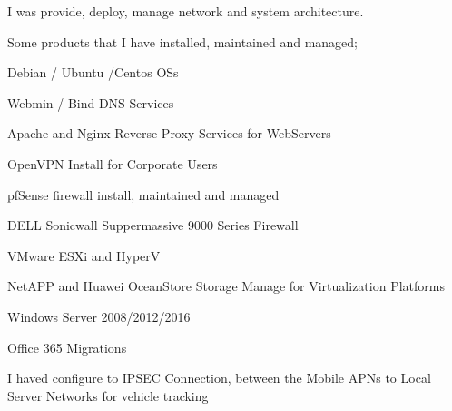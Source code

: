 \begin{cventries}
{\begin{cvitems}
        \item {I was provide, deploy, manage network and system architecture.}
        \item {Some products that I have installed, maintained and managed;}
        \item {Debian / Ubuntu /Centos OSs}
        \item {Webmin / Bind DNS Services}
        \item {Apache and Nginx Reverse Proxy Services for WebServers}
        \item {OpenVPN Install for Corporate Users}
        \item {pfSense firewall install, maintained and managed}
        \item {DELL Sonicwall Suppermassive 9000 Series Firewall}
        \item {VMware ESXi and HyperV}
        \item {NetAPP and Huawei OceanStore Storage Manage for Virtualization Platforms}
        \item {Windows Server 2008/2012/2016}
        \item {Office 365 Migrations}
        \item {I haved configure to IPSEC Connection, between the Mobile APNs to Local Server Networks for vehicle tracking}


      \end{cvitems} 
    }
\end{cventries}